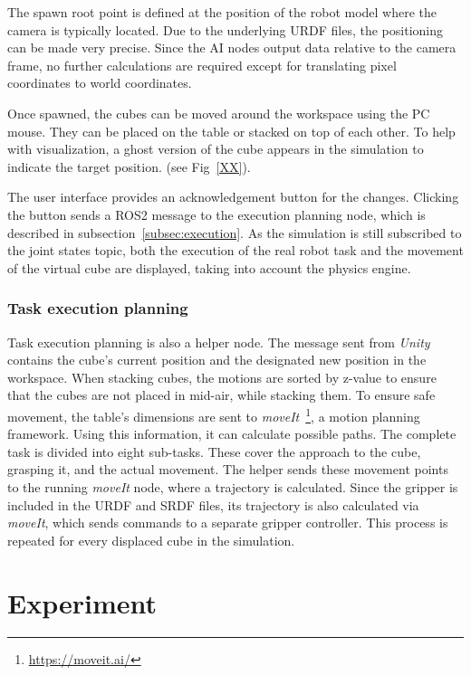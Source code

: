 \documentclass{bmvc2k}
\begin{document}
The spawn root point is defined at the position of the robot model where the camera is typically located. Due to the underlying URDF files, the positioning can be made very precise. Since the AI nodes output data relative to the camera frame, no further calculations are required except for translating pixel coordinates to world coordinates.

Once spawned, the cubes can be moved around the workspace using the PC mouse. They can be placed on the table or stacked on top of each other. To help with visualization, a ghost version of the cube appears in the simulation to indicate the target position. (see Fig~\ref{XX}).

The user interface provides an acknowledgement button for the changes. Clicking the button sends a ROS2 message to the execution planning node, which is described in subsection~\ref{subsec:execution}. As the simulation is still subscribed to the joint states topic, both the execution of the real robot task and the movement of the virtual cube are displayed, taking into account the physics engine.


\subsubsection{Task execution planning}
\label{dw:algo}
\label{subsec:execution}
Task execution planning is also a helper node. The message sent from \textit{Unity} contains the cube's current position and the designated new position in the workspace. When stacking cubes, the motions are sorted by z-value to ensure that the cubes are not placed in mid-air, while stacking them.
To ensure safe movement, the table's dimensions are sent to \textit{moveIt}~\footnote{\url{https://moveit.ai/}}, a motion planning framework. Using this information, it can calculate possible paths. The complete task is divided into eight sub-tasks. These cover the approach to the cube, grasping it, and the actual movement. The helper sends these movement points to the running \textit{moveIt} node, where a trajectory is calculated. Since the gripper is included in the URDF and SRDF files, its trajectory is also calculated via \textit{moveIt}, which sends commands to a separate gripper controller. This process is repeated for every displaced cube in the simulation.


\section{Experiment}
\label{sec:experiment}
\end{document}
